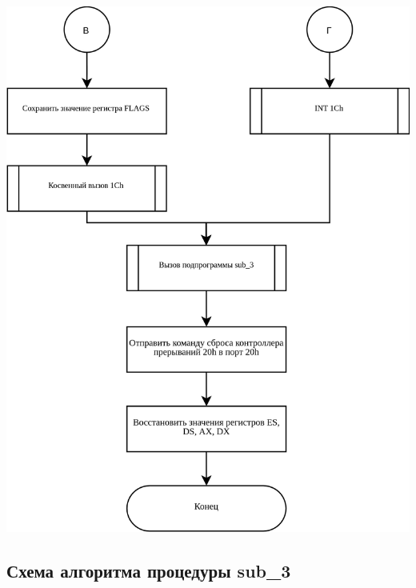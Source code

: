 \documentclass[a4paper,12pt]{article}
\begin{document}
\begin{flushright}
	\includegraphics[height=0.95\textheight]{flowchart/int_8h_4.png}
\end{flushright}

\subsection{Схема алгоритма процедуры sub\_3}
\end{document}
